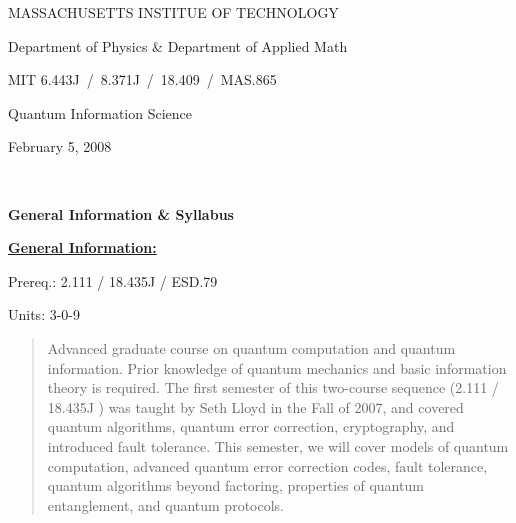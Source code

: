 \documentclass[preprint,pra,12pt]{ikedoc3}
\begin{document}

\centerline{\large MASSACHUSETTS INSTITUE OF TECHNOLOGY}
\vspace*{1ex}
\centerline{\large Department of Physics \& Department of Applied Math}
\vspace*{2ex}

\centerline{\large MIT 6.443J \,/\, 8.371J \,/\, 18.409 \,/\, MAS.865}
\vspace*{1ex}

\centerline{\large Quantum Information Science}
\vspace*{1ex}
\centerline{\large February 5, 2008}

~\\
\centerline{\large \bf General Information \& Syllabus}

\vspace*{4ex}

{\noindent\bf \underline{General Information:}} 

Prereq.: 2.111 / 18.435J / ESD.79
\par
Units: 3-0-9

\begin{quote}
Advanced graduate course on quantum computation and quantum
information.  Prior knowledge of quantum mechanics and basic
information theory is required.  The first semester of this two-course
sequence (2.111 / 18.435J ) was taught by Seth Lloyd in the Fall of
2007, and covered quantum algorithms, quantum error correction,
cryptography, and introduced fault tolerance.  This semester, we will
cover models of quantum computation, advanced quantum error correction
codes, fault tolerance, quantum algorithms beyond factoring,
properties of quantum entanglement, and quantum protocols.

\noindent
\end{quote}
\end{document}
